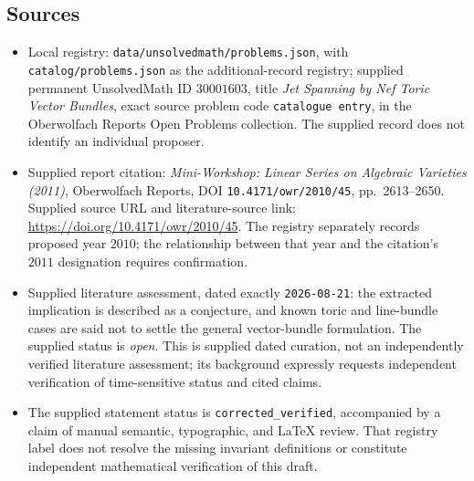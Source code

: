 \documentclass[11pt]{article}
\begin{document}
\subsection{Sources}
\begin{itemize}
\item Local registry: \texttt{data/unsolvedmath/problems.json}, with \texttt{catalog/problems.json} as the additional-record registry; supplied permanent UnsolvedMath ID \(30001603\), title \emph{Jet Spanning by Nef Toric Vector Bundles}, exact source problem code \texttt{catalogue entry}, in the Oberwolfach Reports Open Problems collection. The supplied record does not identify an individual proposer.
\item Supplied report citation: \emph{Mini-Workshop: Linear Series on Algebraic Varieties (2011)}, Oberwolfach Reports, DOI \texttt{10.4171/owr/2010/45}, pp.\ 2613--2650. Supplied source URL and literature-source link: \url{https://doi.org/10.4171/owr/2010/45}. The registry separately records proposed year \(2010\); the relationship between that year and the citation's \(2011\) designation requires confirmation.
\item Supplied literature assessment, dated exactly \texttt{2026-08-21}: the extracted implication is described as a conjecture, and known toric and line-bundle cases are said not to settle the general vector-bundle formulation. The supplied status is \emph{open}. This is supplied dated curation, not an independently verified literature assessment; its background expressly requests independent verification of time-sensitive status and cited claims.
\item The supplied statement status is \texttt{corrected\_verified}, accompanied by a claim of manual semantic, typographic, and LaTeX review. That registry label does not resolve the missing invariant definitions or constitute independent mathematical verification of this draft.
\end{itemize}
\end{document}
